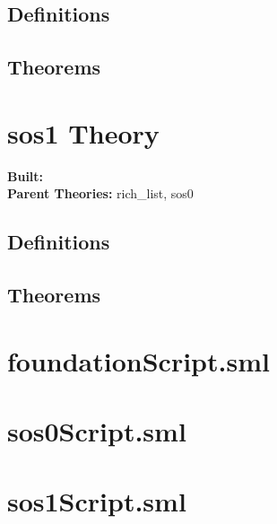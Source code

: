 \documentclass[10pt,twoside]{article}
\begin{document}

\subsection{Definitions}

\HOLsosZeroDefinitions

\subsection{Theorems}

\HOLsosZeroTheorems

\section{sos1 Theory}
\begin{flushleft}
\textbf{Built:} \HOLsosOneDate \\[2pt]
\textbf{Parent Theories:} rich_list, sos0
\end{flushleft}


\subsection{Definitions}

\HOLsosOneDefinitions

\subsection{Theorems}

\HOLsosOneTheorems

\section{foundationScript.sml}
\label{sec:foundationScript}



\section{sos0Script.sml}
\label{sec:sos0Script}



\section{sos1Script.sml}
\label{sec:sos1Script}


\end{document}

